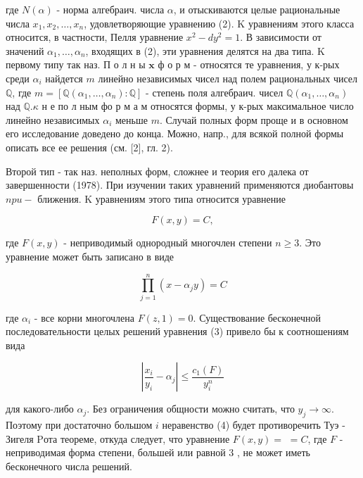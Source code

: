 \documentclass[10pt]{article}
\begin{document}
где $N(\alpha)$ - норма алгебраич. числа $\alpha$, и отыскиваются целые рациональные числа $x_{1}, x_{2}, \ldots, x_{n}$, удовлетворяющие уравнению (2). $\mathrm{K}$ уравнениям этого класса относится, в частности, Пелля уравнение $x^{2}-d y^{2}=1$. В зависимости от значений $\alpha_{1}, \ldots, \alpha_{n}$, входящих в (2), эти уравнения делятся на два типа. K первому типу так наз. П о л н ы $\mathbf{x}$ ф о р м - относятся те уравнения, у к-рых среди $\alpha_{i}$ найдется $m$ линейно независимых чисел над полем рациональных чисел $\mathbb{Q}$, где $m=\left[\mathbb{Q}\left(\alpha_{1}, \ldots, \alpha_{n}\right): \mathbb{Q}\right]$ - степень поля алгебраич. чисел $\mathbb{Q}\left(\alpha_{1}, \ldots, \alpha_{n}\right)$ над $\mathbb{Q} . \kappa$ н е по л ным фо р м а м относятся формы, у к-рых максимальное число линейно независимых $\alpha_{i}$ меньше $m$. Случай полных форм проще и в основном его исследование доведено до конца. Можно, напр., для всякой полной формы описать все ее решения (см. [2], гл. 2).



Второй тип - так наз. неполных форм, сложнее и теория его далека от завершенности (1978). При изучении таких уравнений применяются диобантовы $n p u-$ ближения. K уравнениям этого типа относится уравнение



\[

F(x, y)=C,

\]



где $F(x, y)$ - неприводимый однородный многочлен степени $n \geqslant 3$. Это уравнение может быть записано в виде



\[

\prod_{j=1}^{n}\left(x-\alpha_{j} y\right)=C

\]



где $\alpha_{i}$ - все корни многочлена $F(z, 1)=0$. Существование бесконечной последовательности целых решений уравнения (3) привело бы к соотношениям вида



\[

\left|\frac{x_{i}}{y_{i}}-\alpha_{j}\right| \leqslant \frac{c_{1}(F)}{y_{i}^{n}}

\]



для какого-либо $\alpha_{j}$. Без ограничения общности можно считать, что $y_{j} \rightarrow \infty$. Поэтому при достаточно большом $i$ неравенство (4) будет противоречить Туэ - Зигеля Pота теореме, откуда следует, что уравнение $F(x, y)=$ $=C$, где $F$ - неприводимая форма степени, большей или равной 3 , не может иметь бесконечного числа решений.
\end{document}
